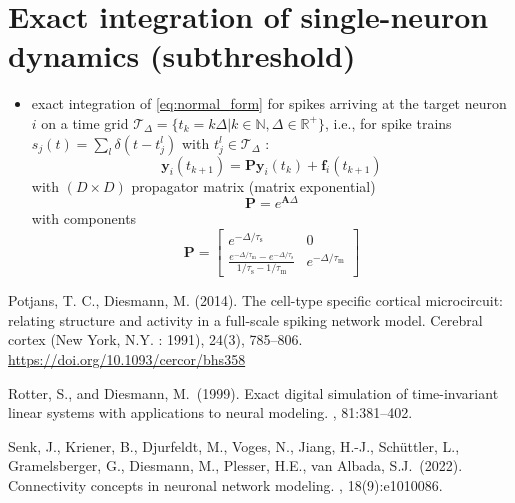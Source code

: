 \documentclass[10pt,a4paper,twoside,american]{article}
\theoremstyle{definitionstyle}
\newcommand{\tauM}{\tau_\text{m}}
\newcommand{\tauS}{\tau_\text{s}}
\begin{document}
\newpage
\section{Exact integration of  single-neuron dynamics (subthreshold)}
\label{sec:exact_integration}

\begin{itemize}
\item exact integration of \eqref{eq:normal_form} for spikes arriving at the target neuron $i$ on a time grid
  \mbox{$\mathcal{T}_\Delta= \{t_k=k\Delta{}|k\in\mathbb{N},\Delta\in\mathbb{R}^+\}$}, i.e.,
  for spike trains \mbox{$s_j(t) = \sum_l\delta(t-t_j^l)$} with $t_j^l\in\mathcal{T}_\Delta$ \citep{Rotter99_381}:
  \begin{equation}
    \label{eq:exact_integration}
    \bm{y}_i(t_{k+1}) = \bm{P}\bm{y}_i(t_k) + \bm{f}_i(t_{k+1})
  \end{equation}
  with $(D\times{}D)$ propagator matrix (matrix exponential)
  \begin{equation}
    \label{eq:matrix_exponential}
    \bm{P} = e^{\bm{A}\Delta}
  \end{equation}
  with components 
  \begin{equation}
	\bm{P} =
	\begin{bmatrix}
      		e^{-\Delta/\tauS} 					     & 0\\
		\frac{e^{-\Delta/\tauM}-e^{-\Delta/\tauS}}{1/\tauS-1/\tauM}  & e^{-\Delta/\tauM}
    	\end{bmatrix}
  \end{equation}
  \citep[see Sec.\,3.2.2 in][]{Rotter99_381}
\end{itemize}




\clearpage
\begin{thebibliography}{}

  Potjans, T. C., Diesmann, M. (2014).
  \newblock The cell-type specific cortical microcircuit: relating structure and activity in a full-scale spiking network model. 
  \newblock Cerebral cortex (New York, N.Y. : 1991), 24(3), 785–806.
  \newblock \url{https://doi.org/10.1093/cercor/bhs358}

  Rotter, S., and Diesmann, M.~(1999).
  \newblock Exact digital simulation of time-invariant linear systems with applications to neural modeling.
  , 81:381--402.

  Senk, J., Kriener, B., Djurfeldt, M., Voges, N., Jiang, H.-J., Sch\"uttler, L., Gramelsberger, G., Diesmann, M., Plesser, H.E., van Albada, S.J.~(2022).
  \newblock Connectivity concepts in neuronal network modeling.
  , 18(9):e1010086.

  
\end{thebibliography}
\end{document}
